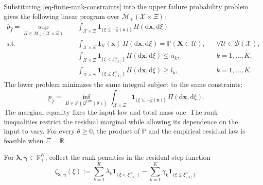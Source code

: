 \documentclass[review,11pt,3p,authoryear,nopreprintline]{elsarticle}
\begin{document}
Substituting \eqref{eq-finite-rank-constraints} into the upper failure probability problem gives the following linear program over $\mathcal M_+(\mathcal X\times\Xi)$:
\begin{equation}
  \begin{aligned}
    \overline p_{\hat f}
    =\sup_{\Pi\in\mathcal M_+(\mathcal X\times\Xi)}\quad&
      \int_{\mathcal X\times\Xi}
      \mathbf1_{\{\xi\le -\hat g(\bm x)\}}\,\Pi(\mathrm d\bm x,\mathrm d\xi)\\
    \text{s.t.}\quad&
      \int_{\mathcal X\times\Xi}
      \mathbf1_{\mathcal U}(\bm x)\,\Pi(\mathrm d\bm x,\mathrm d\xi)
      =\mathbb P(\bm X\in\mathcal U),
      &&\forall \mathcal U\in\mathcal B(\mathcal X),\\
    &\int_{\mathcal X\times\Xi}
      \mathbf1_{\{\xi<\xi_{(k)}^{\mathrm{te}}\}}\,\Pi(\mathrm d\bm x,\mathrm d\xi)\le u_k,
      &&k=1,\ldots,K,\\
    &\int_{\mathcal X\times\Xi}
      \mathbf1_{\{\xi\le \xi_{(k)}^{\mathrm{te}}\}}\,\Pi(\mathrm d\bm x,\mathrm d\xi)\ge l_k,
      &&k=1,\ldots,K.
  \end{aligned}
  \label{eq-measure-upper}
\end{equation}
The lower problem minimizes the same integral subject to the same constraints:
\begin{equation*}
  \underline p_{\hat f}
  =\inf_{\Pi\in\mathcal P(\mathcal Q^{\mathrm{DW}}(\theta))}
    \int_{\mathcal X\times\Xi}
    \mathbf1_{\{\xi\le -\hat g(\bm x)\}}\,\Pi(\mathrm d\bm x,\mathrm d\xi).
\end{equation*}
The marginal equality fixes the input law and total mass one. The rank inequalities restrict the residual marginal while allowing its dependence on the input to vary. For every $\theta\ge0$, the product of $\mathbb P$ and the empirical residual law is feasible when $\Xi=\mathbb R$.

For $\bm\lambda,\bm\gamma\in\mathbb R_+^K$, collect the rank penalties in the residual step function
\begin{equation}
  \zeta_{\bm\lambda,\bm\gamma}(\xi)
  :=\sum_{k=1}^K\lambda_k\mathbf1_{\{\xi<\xi_{(k)}^{\mathrm{te}}\}}
    -\sum_{k=1}^K\gamma_k\mathbf1_{\{\xi\le\xi_{(k)}^{\mathrm{te}}\}}.
  \label{eq-dual-step-function}
\end{equation}
\end{document}
